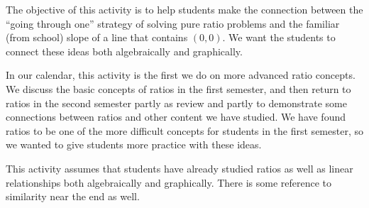 \documentclass{ximera}
\begin{document}
\newpage
\begin{instructorNotes}
The objective of this activity is to help students make the connection between the ``going through one'' strategy of solving pure ratio problems and the familiar (from school) slope of a line that contains $(0, 0)$.  We want the students to connect these ideas both algebraically and graphically.  

In our calendar, this activity is the first we do on more advanced ratio concepts.  We discuss the basic concepts of ratios in the first semester, and then return to ratios in the second semester partly as review and partly to demonstrate some connections between ratios and other content we have studied.  We have found ratios to be one of the more difficult concepts for students in the first semester, so we wanted to give students more practice with these ideas.

This activity assumes that students have already studied ratios as well as linear relationships both algebraically and graphically.  There is some reference to similarity near the end as well.



\end{instructorNotes}
\end{document}
